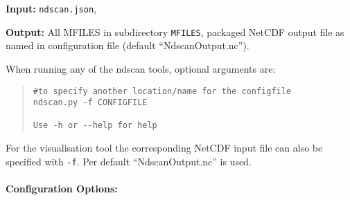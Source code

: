 \begin{description}
\item{\textbf{Input:}}
 \texttt{ndscan.json}, \indat

\item{\textbf{Output:}} All MFILES in subdirectory \texttt{MFILES}, packaged NetCDF output file as named in configuration file (default ``NdscanOutput.nc'').
\end{description}

When running any of the ndscan tools, optional arguments are:
\begin{quote}
\begin{verbatim}
#to specify another location/name for the configfile
ndscan.py -f CONFIGFILE

Use -h or --help for help
\end{verbatim}
\end{quote}
For the visualisation tool the corresponding NetCDF input file can also be specified with \texttt{-f}. Per default ``NdscanOutput.nc'' is used.

\paragraph{Configuration Options:}

